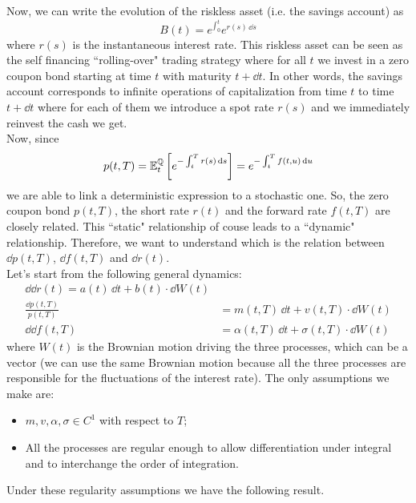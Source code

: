 Now, we can write the evolution of the riskless asset (i.e. the savings account) as
\begin{equation}
    B(t) = e^{\int_0^t} e^{r(s)\,\dd s}
\end{equation}
where $r(s)$ is the instantaneous interest rate. This riskless asset can be seen as the self financing ``rolling-over" trading strategy where for all $t$ we invest in a zero coupon bond starting at time $t$ with maturity $t+\dd t$. In other words, the savings account corresponds to infinite operations of capitalization from time $t$ to time $t+\dd t$ where for each of them we introduce a spot rate $r(s)$ and we immediately reinvest the cash we get. \\
Now, since
\begin{equation}
    p(t,T) = \mathbb{E}^{\mathbb{Q}}_t\left[e^{-\int_t^T r(s)\,\dd s}\right] = e^{-\int_t^T f(t,u)\,\dd u}
\end{equation}
we are able to link a deterministic expression to a stochastic one. So, the zero coupon bond $p(t,T)$, the short rate $r(t)$ and the forward rate $f(t,T)$ are closely related. This ``static" relationship of couse leads to a ``dynamic" relationship. Therefore, we want to understand which is the relation between $\dd p(t,T)$, $\dd f(t,T)$ and $\dd r(t)$.\\
Let's start from the following general dynamics:
\begin{align}
    \dd \dd r(t) = a(t)\,\dd t + b(t)\cdot \dd W(t) \\
    \frac{\dd p(t,T)}{p(t,T)} &= m(t,T)\,\dd t + v(t,T)\cdot \dd W(t) \label{zcbdyn} \\
    \dd \dd f(t,T) &= \alpha(t,T)\,\dd t + \sigma(t,T)\cdot \dd W(t)
\end{align}
where $W(t)$ is the Brownian motion driving the three processes, which can be a vector (we can use the same Brownian motion because all the three processes are responsible for the fluctuations of the interest rate). The only assumptions we make are:
\begin{itemize}
    \item $m, v, \alpha, \sigma \in C^1$ with respect to $T$;
    \item All the processes are regular enough to allow differentiation under integral and to interchange the order of integration.
\end{itemize}
Under these regularity assumptions we have the following result.
